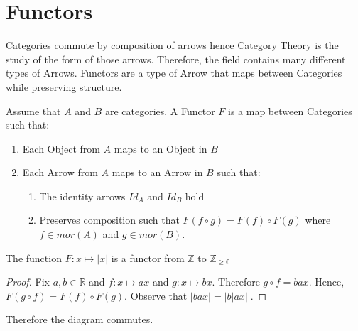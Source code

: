 \documentclass{article}
\begin{document}

\section{Functors}
Categories commute by composition of arrows hence Category Theory is the study of the form of those arrows. Therefore, the field contains many different types of Arrows. Functors are a type of Arrow that maps between Categories while preserving structure.
\begin{definition}
    Assume that $A$ and $B$ are categories. A Functor $F$ is a map between Categories such that:
    \begin{enumerate}
        \item Each Object from $A$ maps to an Object in $B$
        \item Each Arrow from $A$ maps to an Arrow in $B$ such that:
        \begin{enumerate}
            \item The identity arrows  $Id_A$ and $Id_B$ hold
            \item Preserves composition such that $F(f \circ g) = F(f)\circ F(g)$ where $f \in mor(A)$ and $g \in mor(B)$.
        \end{enumerate}
    \end{enumerate}
\end{definition}

\begin{theorem}
The function $F: x \mapsto |x|$ is a functor from $\mathbb{Z}$ to $\mathbb{Z_{\ge 0}}$
\end{theorem}
\begin{proof}
Fix $a,b \in \mathbb{R}$ and $f: x \mapsto ax$ and $g: x \mapsto bx$. Therefore $g \circ f = bax$. Hence, $F(g \circ f) = F(f) \circ F(g)$. Observe that $|bax| = |b|ax||$.
\end{proof}
\begin{center}
\end{center}
Therefore the diagram commutes.



\end{document}
